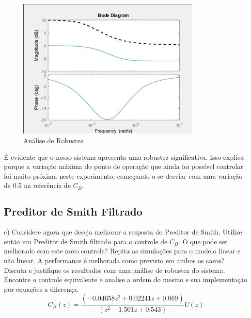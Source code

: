 \documentclass[a4paper,12pt]{article}
\begin{document}
  \begin{figure}[H]
  \centering
  \includegraphics[width=0.82\textwidth]{figure10.png}
  \caption{Análise de Robustez }
  \end{figure}

É evidente que o nosso sistema apresenta uma robustez significativa. Isso explica porque a variação máxima do ponto de operação que ainda foi possível controlar foi muito próxima neste experimento, começando a se desviar com uma variação de 0.5 na referência de \(C_B\).

















\subsection{Preditor de Smith Filtrado}

c) Considere agora que deseja melhorar a resposta do Preditor de Smith. Utilize então um Preditor de Smith filtrado para o controle de \(C_B\). O que pode ser melhorado com este novo controle? Repita as simulações para o modelo linear e não linear. A performance é melhorada como previsto em ambos os casos? Discuta e justifique os resultados com uma análise de robustez do sistema. Encontre o controle equivalente e analise a ordem do mesmo e sua implementação por equações a diferença.\\

\begin{equation}
C_{B}(z) = \frac{(-0.04658z^2 + 0.02241z + 0.069)}{(z^2 - 1.501z + 0.543)} U(z)
\end{equation}
\end{document}
